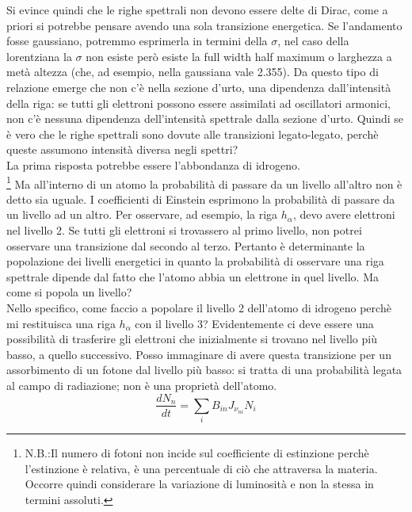 \documentclass[a4paper,11pt]{article}
\begin{document}
    Si evince quindi che le righe spettrali non devono essere delte di Dirac, come a priori si potrebbe pensare avendo una sola transizione energetica. Se l'andamento fosse gaussiano, potremmo esprimerla in termini della $\sigma$, nel caso della lorentziana la $\sigma$ non esiste però esiste la full width half maximum o larghezza a metà altezza (che, ad esempio, nella gaussiana vale 2.355). Da questo tipo di relazione emerge che non c'è nella sezione d'urto, una dipendenza dall'intensità della riga: se tutti gli elettroni possono essere assimilati ad oscillatori armonici, non c'è nessuna dipendenza dell'intensità spettrale dalla sezione d'urto. Quindi se è vero che le righe spettrali sono dovute alle transizioni legato-legato, perchè queste assumono intensità diversa negli spettri?\\ La prima risposta potrebbe essere l'abbondanza di idrogeno. \\\footnote{N.B.:Il numero di fotoni non incide sul coefficiente di estinzione perchè l'estinzione è relativa, è una percentuale di ciò che attraversa la materia. Occorre quindi considerare la variazione di luminosità e non la stessa in termini assoluti.} Ma all'interno di un atomo la probabilità di passare da un livello all'altro non è detto sia uguale. I coefficienti di Einstein esprimono la probabilità di passare da un livello ad un altro.
    Per osservare, ad esempio, la riga $h_{\alpha}$, devo avere elettroni nel livello 2. Se tutti gli elettroni si trovassero al primo livello, non potrei osservare una transizione dal secondo al terzo. Pertanto è determinante la popolazione dei livelli energetici in quanto la probabilità di osservare una riga spettrale dipende dal fatto che l'atomo abbia un elettrone in quel livello. Ma come si popola un livello?\\ Nello specifico, come faccio a popolare il livello 2 dell'atomo di idrogeno perchè mi restituisca una riga $h_{\alpha}$ con il livello 3?
    Evidentemente ci deve essere una possibilità di trasferire gli elettroni che inizialmente si trovano nel livello più basso, a quello successivo. Posso immaginare di avere questa transizione per un assorbimento di un fotone dal livello più basso: si tratta di una probabilità legata al campo di radiazione; non è una proprietà dell'atomo.
    $$
        \frac{dN_n}{dt} =  \sum_{i}B_{in}J_{{\nu}_{ni}}N_i
    $$
\end{document}
